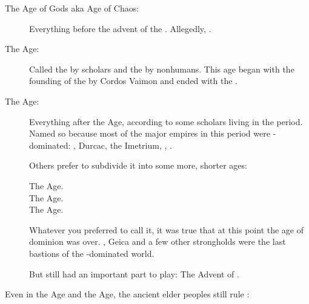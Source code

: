 \begin{description}
  \item[The Age of Gods aka Age of Chaos:]
    Everything before the advent of the \VaimonCaliphate. 
    Allegedly, .
  
  \item[The \Human Age:]
    Called the  by \human{} scholars and the  by nonhumans. 
    This age began with the founding of the \VaimonCaliphate by Cordos Vaimon and ended with the \Darkfall. 
  
  \item[The \Scatha Age:]
    Everything after the \Human{} Age, according to some \scathaese{} scholars living in the period. 
    Named so because most of the major empires in this period were \scatha-dominated:
    \Ortaica, Durcac, the Imetrium, \Tepharae{}, \Velcad. 
    
    Others prefer to subdivide it into some more, shorter ages:
    
    \begin{description}
      \item[The \Ortaican Age.]
      \item[The \Tepharin Age.]
      \item[The \Velcadian Age.]
    \end{description}
    
    Whatever you preferred to call it, it was true that at this point the age of \human{} dominion was over. 
    \Redce, Geica and a few other strongholds were the last bastions of the \human-dominated world. 
    
    But \humanity{} still had an important part to play: 
    The Advent of . 
\end{description}

Even in the \Human Age and the \Scatha Age, the ancient elder peoples still rule \Miith:

